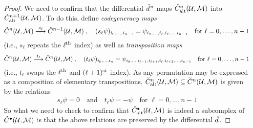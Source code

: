 \documentclass[a4paper,parskip=half,numbers=enddot, DIV=12]{scrreprt}
\begin{document}
	\begin{proof}
		We need to confirm that the differential $\check{d}\hspace{0.06125em}^n$ maps $\check{C}_{\mathrm{alt}}^n(\mathcal{U},\mathcal{M})$ into $\check{C}_{\mathrm{alt}}^{n+1}(\mathcal{U},\mathcal{M})$. To do this, define \emph{codegeneracy maps} 
		\begin{align*}
			\check{C}^n(\Uu,\Mm)\morphism[s_\ell]\check{C}^{n-1}(\Uu,\Mm)\;,\quad (s_\ell\psi)_{i_0,\ldots,i_{n-1}}=\psi_{i_0,\ldots,i_\ell,i_\ell,\ldots,i_{n-1}}\quad\text{for }\ell=0,\ldots,n-1
		\end{align*}
		(i.e., $s_\ell$ repeats the $\ell^{\text{th}}$ index) as well as \emph{transposition maps}
		\begin{align*}
			\check{C}^n(\Uu,\Mm)\morphism[t_\ell]\check{C}^n(\Uu,\Mm)\;,\quad (t_\ell\psi)_{i_0,\ldots,i_n}=\psi_{i_0,\ldots,i_{\ell-1},i_{\ell+1},i_\ell,i_{\ell+2},\ldots,i_{n-1}}\quad\text{for }\ell=0,\ldots,n-1
		\end{align*}
		(i.e., $t_\ell$ swaps the $\ell^{\text{th}}$ and $(\ell+1)^{\text{st}}$ index). As any permutation may be expressed as a composition of elementary transpositions, $\check{C}_{\mathrm{alt}}^n(\mathcal{U},\mathcal{M})\subseteq\check{C}^n(\mathcal{U},\mathcal{M})$ is given by the relations
		\begin{align*}
			s_\ell\psi=0\quad\text{and}\quad t_\ell\psi=-\psi\quad\text{for }\ell=0,\ldots,n-1
		\end{align*}
		So what we need to check to confirm that $\check{C}_{\mathrm{alt}}^\bullet (\mathcal{U},\mathcal{M})$ is indeed a subcomplex of $\check{C}^\bullet (\mathcal{U},\mathcal{M})$ is that the above relations are preserved by the differential $\check{d}\hspace{0.06125em}$.
		

\end{proof}
\end{document}
